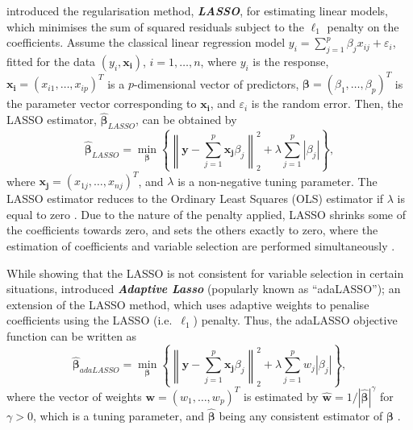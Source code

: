 \documentclass[11pt,a4paper,]{article}
\begin{document}
\textcite{Tibshirani1996} introduced the regularisation method,
\textbf{\emph{LASSO}}, for estimating linear models, which minimises the
sum of squared residuals subject to the \(\ell_{1}\) penalty on the
coefficients. Assume the classical linear regression model
\(y_{i} = \sum_{j=1}^{p} {\beta_{j}x_{ij}} +\varepsilon_{i}\), fitted
for the data \((y_{i}, \bm{x_{i}})\), \(i = 1, \dots, n\), where
\(y_{i}\) is the response, \(\bm{x_{i}} = (x_{i1}, \dots, x_{ip})^T\) is
a \(p\)-dimensional vector of predictors,
\(\bm{\beta} = (\beta_{1}, \dots, \beta_{p})^{T}\) is the parameter
vector corresponding to \(\bm{x_{i}}\), and \(\varepsilon_{i}\) is the
random error. Then, the LASSO estimator, \(\bm{\hat{\beta}}_{LASSO}\),
can be obtained by \[
 \bm{\hat{\beta}}_{LASSO} = \min_{\bm{\beta}}\left\{\left\lVert\bm{y} - \sum_{j=1}^{p} {\bm{x_{j}}\beta_{j}}\right\rVert_{2}^{2} + \lambda\sum_{j=1}^{p} {|\beta_{j}|}\right\},
\] where \(\bm{x_{j}} = \left (x_{1j}, \dots, x_{nj}\right )^{T}\), and
\(\lambda\) is a non-negative tuning parameter. The LASSO estimator
reduces to the Ordinary Least Squares (OLS) estimator if \(\lambda\) is
equal to zero \autocite{Konzen2016}. Due to the nature of the penalty
applied, LASSO shrinks some of the coefficients towards zero, and sets
the others exactly to zero, where the estimation of coefficients and
variable selection are performed simultaneously \autocite{Konzen2016}.

While showing that the LASSO is not consistent for variable selection in
certain situations, \textcite{Zou2006} introduced \textbf{\emph{Adaptive
Lasso}} (popularly known as ``adaLASSO''); an extension of the LASSO
method, which uses adaptive weights to penalise coefficients using the
LASSO (i.e.~\(\ell_{1}\)) penalty. Thus, the adaLASSO objective function
can be written as \[
 \bm{\hat{\beta}}_{adaLASSO} = \min_{\bm{\beta}}\left\{\left\lVert\bm{y} - \sum_{j=1}^{p} {\bm{x_{j}}\beta_{j}}\right\rVert_{2}^{2} + \lambda\sum_{j=1}^{p} {w_{j}|\beta_{j}|}\right\},
\] where the vector of weights
\(\bm{w} = \left (w_{1}, \dots, w_{p} \right )^{T}\) is estimated by
\(\bm{\hat{w}} = 1/|\bm{\hat{\beta}}|^{\gamma}\) for \(\gamma > 0\),
which is a tuning parameter, and \(\bm{\hat{\beta}}\) being any
consistent estimator of \(\bm{\beta}\) \autocite{Zou2006}.
\end{document}
